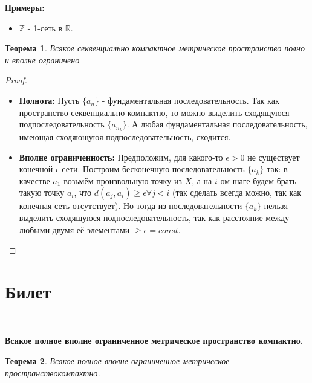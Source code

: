 \documentclass[a4paper,100pt]{article}
\theoremstyle{indented}
\newtheorem{theorem}{Теорема}
\begin{document}
\textbf{Примеры:} 
\begin{itemize}
    \item $\mathbb{Z}$ - 1-сеть в $\mathbb{R}$.
\end{itemize}
\begin{theorem}
Всякое секвенциально компактное метрическое пространство полно и вполне ограничено
\end{theorem}
\begin{proof}
~
\begin{itemize}
    \item \textbf{Полнота:} Пусть $\{a_n\}$ - фундаментальная последовательность. Так как пространство секвенциально компактно, то можно выделить сходящуюся подпоследовательность $\{a_{n_k}\}$. А любая фундаментальная последовательность, имеющая сходяющуюя подпоследовательность, сходится.
    \item \textbf{Вполне ограниченность: } Предположим, для какого-то $\epsilon > 0$ не существует конечной $\epsilon$-сети. Построим бесконечную последовательность $\{a_k\}$ так: в качестве $a_1$ возьмём произвольную точку из $X$, а на $i$-ом шаге будем брать такую точку $a_i$, что $d(a_j, a_i) \geq \epsilon \forall j < i$ (так сделать всегда можно, так как конечная сеть отсутствует). Но тогда из последовательности $\{a_k\}$ нельзя выделить сходящуюся подпоследовательность, так как расстояние между любыми двумя её элементами $\geq \epsilon=const$.
\end{itemize}
\end{proof}

\section{Билет} \

\medskip

\textbf{Всякое полное вполне ограниченное метрическое пространство компактно.}\\

\begin{theorem}
    Всякое полное вполне ограниченное метрическое пространствокомпактно.
\end{theorem}
\end{document}
